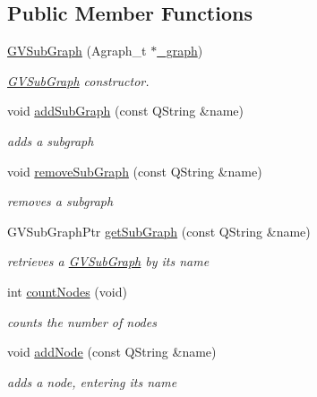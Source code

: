 \subsection*{\-Public \-Member \-Functions}
\begin{DoxyCompactItemize}
\item 
\hyperlink{class_g_v_sub_graph_a2a830f5288096466cff627fb221003f3}{\-G\-V\-Sub\-Graph} (\-Agraph\-\_\-t $\ast$\hyperlink{class_g_v_sub_graph_ae9ba380851ecbc611bbe9cd2980ba152}{\-\_\-graph})
\begin{DoxyCompactList}\small\item\em \hyperlink{class_g_v_sub_graph}{\-G\-V\-Sub\-Graph} constructor. \end{DoxyCompactList}\item 
void \hyperlink{class_g_v_sub_graph_a7999f5541dde4ad692b8f1765675e106}{add\-Sub\-Graph} (const \-Q\-String \&name)
\begin{DoxyCompactList}\small\item\em adds a subgraph \end{DoxyCompactList}\item 
void \hyperlink{class_g_v_sub_graph_a1bed9f509bbe210754ed6e2878a75dff}{remove\-Sub\-Graph} (const \-Q\-String \&name)
\begin{DoxyCompactList}\small\item\em removes a subgraph \end{DoxyCompactList}\item 
\-G\-V\-Sub\-Graph\-Ptr \hyperlink{class_g_v_sub_graph_abfbc0deb675aaf2e0bf0551b17506818}{get\-Sub\-Graph} (const \-Q\-String \&name)
\begin{DoxyCompactList}\small\item\em retrieves a \hyperlink{class_g_v_sub_graph}{\-G\-V\-Sub\-Graph} by its name \end{DoxyCompactList}\item 
int \hyperlink{class_g_v_sub_graph_af0087db5d9f5a53132f1b46b636377f9}{count\-Nodes} (void)
\begin{DoxyCompactList}\small\item\em counts the number of nodes \end{DoxyCompactList}\item 
void \hyperlink{class_g_v_sub_graph_a99ea8e4c658ea76fc5425644a460362d}{add\-Node} (const \-Q\-String \&name)
\begin{DoxyCompactList}\small\item\em adds a node, entering its name \end{DoxyCompactList}\item 

\end{DoxyCompactItemize}

